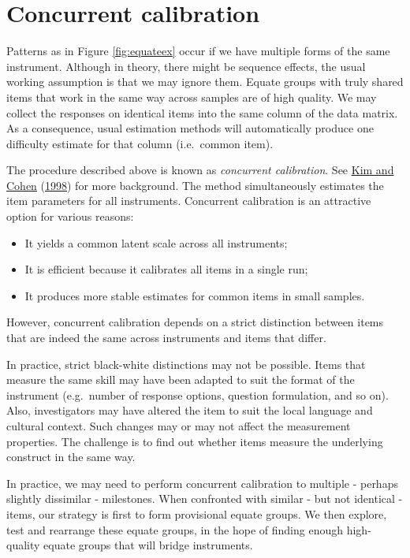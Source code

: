 \documentclass[
]{book}
\providecommand{\tightlist}{%
  \setlength{\itemsep}{0pt}\setlength{\parskip}{0pt}}
\begin{document}
\hypertarget{sec:concurrent}{%
\section{Concurrent calibration}\label{sec:concurrent}}

Patterns as in Figure \ref{fig:equateex} occur if we have multiple forms of the same instrument. Although in theory, there might be sequence effects, the usual working assumption is that we may ignore them. Equate groups with truly shared items that work in the same way across samples are of high quality. We may collect the responses on identical items into the same column of the data matrix. As a consequence, usual estimation methods will automatically produce one difficulty estimate for that column (i.e.~common item).

The procedure described above is known as \emph{concurrent calibration}. See \protect\hyperlink{ref-kim1998}{Kim and Cohen} (\protect\hyperlink{ref-kim1998}{1998}) for more background. The method simultaneously estimates the item parameters for all instruments. Concurrent calibration is an attractive option for various reasons:

\begin{itemize}
\tightlist
\item
  It yields a common latent scale across all instruments;
\item
  It is efficient because it calibrates all items in a single run;
\item
  It produces more stable estimates for common items in small samples.
\end{itemize}

However, concurrent calibration depends on a strict distinction between items that are indeed the same across instruments and items that differ.

In practice, strict black-white distinctions may not be possible. Items that measure the same skill may have been adapted to suit the format of the instrument (e.g.~number of response options, question formulation, and so on). Also, investigators may have altered the item to suit the local language and cultural context. Such changes may or may not affect the measurement properties. The challenge is to find out whether items measure the underlying construct in the same way.

In practice, we may need to perform concurrent calibration to multiple - perhaps slightly dissimilar - milestones. When confronted with similar - but not identical - items, our strategy is first to form provisional equate groups. We then explore, test and rearrange these equate groups, in the hope of finding enough high-quality equate groups that will bridge instruments.
\end{document}
